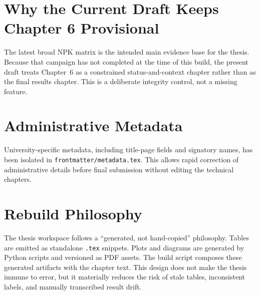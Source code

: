 \section{Why the Current Draft Keeps Chapter 6 Provisional}

The latest broad NPK matrix is the intended main evidence base for the thesis. Because that campaign has not completed at the time of this build, the present draft treats Chapter~6 as a constrained status-and-context chapter rather than as the final results chapter. This is a deliberate integrity control, not a missing feature.

\section{Administrative Metadata}

University-specific metadata, including title-page fields and signatory names, has been isolated in \texttt{frontmatter/metadata.tex}. This allows rapid correction of administrative details before final submission without editing the technical chapters.

\section{Rebuild Philosophy}

The thesis workspace follows a ``generated, not hand-copied'' philosophy. Tables are emitted as standalone \texttt{.tex} snippets. Plots and diagrams are generated by Python scripts and versioned as PDF assets. The build script composes these generated artifacts with the chapter text. This design does not make the thesis immune to error, but it materially reduces the risk of stale tables, inconsistent labels, and manually transcribed result drift.
